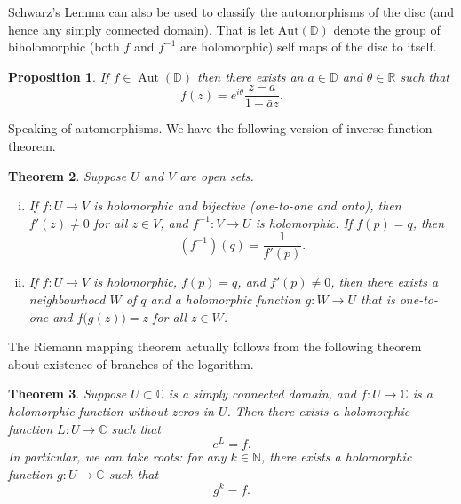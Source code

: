 \documentclass[12pt,openany]{book}
\newcommand{\C}{{\mathbb{C}}}
\newcommand{\R}{{\mathbb{R}}}
\newcommand{\N}{{\mathbb{N}}}
\newcommand{\D}{{\mathbb{D}}}
\theoremstyle{plain}
\newtheorem{thm}{Theorem}[section]
\newtheorem{prop}[thm]{Proposition}
\theoremstyle{remark}
\theoremstyle{definition}
\theoremstyle{exercise}
\theoremstyle{example}
\begin{document}
Schwarz's Lemma can also be used to classify the automorphisms of the disc
(and hence any simply connected domain).  That is let
$\operatorname{Aut(\D)}$ denote the group of biholomorphic (both $f$ and
$f^{-1}$ are holomorphic) self maps of the
disc to itself.

\begin{prop}
If $f \in \operatorname{Aut}(\D)$ then there exists an $a \in \D$
and $\theta \in \R$ such that
\begin{equation*}
f(z) = e^{i\theta} \frac{z-a}{1-\bar{a}z} .
\end{equation*}
\end{prop}

Speaking of automorphisms.  We have the following
version of inverse function theorem.

\begin{thm}
Suppose $U$ and $V$ are open sets.
\begin{enumerate}[(i)]
\item
If $f \colon U \to V$ is holomorphic and bijective (one-to-one and onto),
then $f'(z) \not= 0$ for all $z \in V$, and $f^{-1} \colon V \to U$
is holomorphic.  If $f(p) = q$, then
\begin{equation*}
\left(f^{-1}\right)(q) = \frac{1}{f'(p)} .
\end{equation*}
\item
If $f \colon U \to V$ is holomorphic, $f(p) = q$,
and $f'(p) \not= 0$, then there exists a neighbourhood $W$ of $q$
and a holomorphic function $g \colon W \to U$ that is
one-to-one and $f\bigl(g(z)\bigr) = z$ for all $z \in W$.
\end{enumerate}
\end{thm}

The Riemann mapping theorem actually follows from the following
theorem about existence of branches of the logarithm.

\begin{thm}
Suppose $U \subset \C$ is a simply connected domain, and $f \colon U \to \C$
is a holomorphic function without zeros in $U$.  Then there exists a
holomorphic function $L \colon U \to \C$ such that
\begin{equation*}
e^L = f .
\end{equation*}
In particular, we can take roots:
for any $k \in \N$, there exists a holomorphic function
$g \colon U \to \C$ such that
\begin{equation*}
g^k = f .
\end{equation*}
\end{thm}
\end{document}
